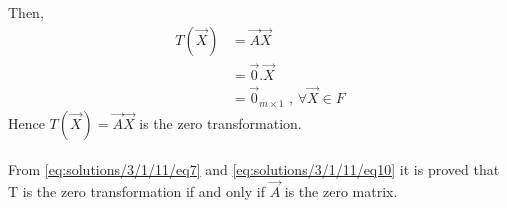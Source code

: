 Then,
\begin{align}
	\label{eq:solutions/3/1/11/eq9}T(\vec{X}) &= \vec{A}\vec{X}\\
	&= \vec{0}.\vec{X}\\ 
	\label{eq:solutions/3/1/11/eq10}&= \vec{0}_{m \times 1}\text{     ,  }\forall \vec{X} \in F
\end{align}
Hence $T(\vec{X}) = \vec{A}\vec{X}$ is the zero transformation.\\
\\
From \eqref{eq:solutions/3/1/11/eq7} and \eqref{eq:solutions/3/1/11/eq10} it is proved that T is the zero transformation if and only if $\vec{A}$ is the zero matrix.
